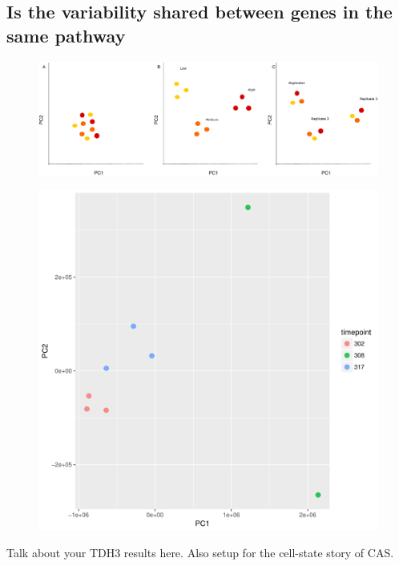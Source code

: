 \subsection{ Is the variability shared between genes in the same pathway}

\begin{figure}[t!]  
    \centering
    \includegraphics[width=\linewidth, scale=0.5]{figures/intro/intro_clustering_expectedresults.pdf}
    \caption[]{%
        \textbf{}
    }
    \label{fig:aim1_task1}
\end{figure}



\begin{figure}[t!]  
    \centering
    \includegraphics[width=\linewidth]{figures/intro/intro_tdh2_clustering_observed.pdf}
    \caption[]{%
        \textbf{}
    }
    \label{fig:tdh2_pca}
\end{figure}
Talk about your TDH3 results here. Also setup for the cell-state story of CAS.



